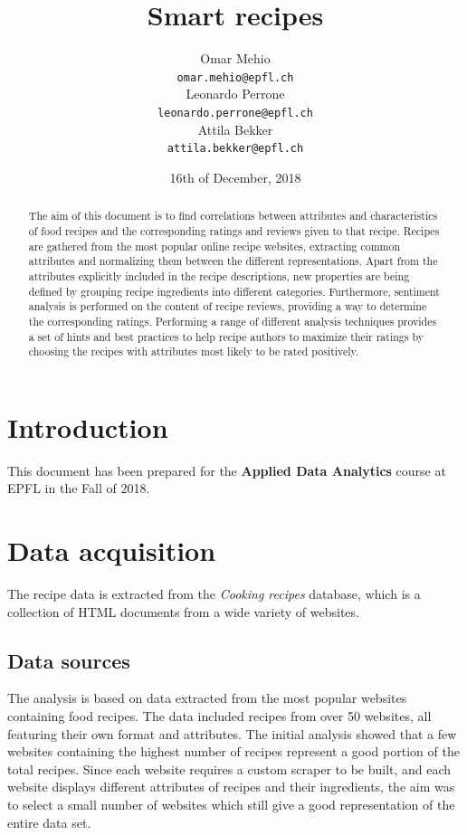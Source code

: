 \documentclass[11pt]{article}
\title{Smart recipes}
\author{Omar Mehio \\
  {\tt\small omar.mehio@epfl.ch} \\\And
  Leonardo Perrone \\
  {\tt\small leonardo.perrone@epfl.ch} \\\And
  Attila Bekker \\
  {\tt\small attila.bekker@epfl.ch} \\}
\date{16th of December, 2018}
\begin{document}
\maketitle
\begin{abstract}
  The aim of this document is to find correlations between attributes and characteristics of food recipes and the corresponding ratings and reviews given to that recipe.
  Recipes are gathered from the most popular online recipe websites, extracting common attributes and normalizing them between the different representations. Apart from the attributes explicitly included in the recipe descriptions, new properties are being defined by grouping recipe ingredients into different categories. Furthermore, sentiment analysis is performed on the content of recipe reviews, providing a way to determine the corresponding ratings.
  Performing a range of different analysis techniques provides a set of hints and best practices to help recipe authors to maximize their ratings by choosing the recipes with attributes most likely to be rated positively.
\end{abstract}

\section{Introduction}

This document has been prepared for the \textbf{Applied Data Analytics} course at EPFL in the Fall of 2018.

\section{Data acquisition}

The recipe data is extracted from the \textit{Cooking recipes} database, which is a collection of HTML documents from a wide variety of websites.

\subsection{Data sources}

The analysis is based on data extracted from the most popular websites containing food recipes. The data included recipes from over 50 websites, all featuring their own format and attributes. The initial analysis showed that a few websites containing the highest number of recipes represent a good portion of the total recipes. Since each website requires a custom scraper to be built, and each website displays different attributes of recipes and their ingredients, the aim was to select a small number of websites which still give a good representation of the entire data set.
\end{document}
